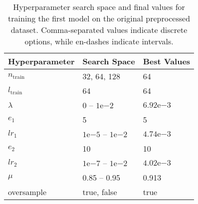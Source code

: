 \begin{table}%
  \centering
  \begin{tabular}{l | l | l}
    Hyperparameter    & Search Space                           & Best Values \\
    \hline
    $n_\text{train}$  & 32, 64, 128                            & 64 \\
    $l_\text{train}$  & 64                                     & 64 \\
    $\lambda$         & 0 -- $1\mathrm{e}{-2}$                 & $6.92\mathrm{e}{-3}$ \\
    $e_1$             & 5                                      & 5 \\
    $lr_1$            & $1\mathrm{e}{-5}$ -- $1\mathrm{e}{-2}$ & $4.74\mathrm{e}{-3}$ \\
    $e_2$             & 10                                     & 10 \\
    $lr_2$            & $1\mathrm{e}{-7}$ -- $1\mathrm{e}{-2}$ & $4.02\mathrm{e}{-3}$ \\
    $\mu$             & 0.85 -- 0.95                           & 0.913 \\
    oversample        & true, false                            & true
  \end{tabular}
  \caption{Hyperparameter search space and final values for training the first model on the original preprocessed dataset.  Comma-separated values indicate discrete options, while en-dashes indicate intervals.}
  \label{tab:hyp_orig}
\end{table}

